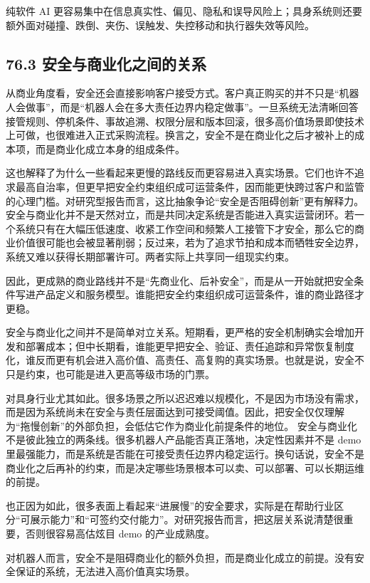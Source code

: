 纯软件 AI 更容易集中在信息真实性、偏见、隐私和误导风险上；具身系统则还要额外面对碰撞、跌倒、夹伤、误触发、失控移动和执行器失效等风险。

\subsection*{76.3 安全与商业化之间的关系}


从商业角度看，安全还会直接影响客户接受方式。客户真正购买的并不只是“机器人会做事”，而是“机器人会在多大责任边界内稳定做事”。一旦系统无法清晰回答接管规则、停机条件、事故追溯、权限分层和版本回滚，很多高价值场景即使技术上可做，也很难进入正式采购流程。换言之，安全不是在商业化之后才被补上的成本项，而是商业化成立本身的组成条件。

这也解释了为什么一些看起来更慢的路线反而更容易进入真实场景。它们也许不追求最高自治率，但更早把安全约束组织成可运营条件，因而能更快跨过客户和监管的心理门槛。对研究型报告而言，这比抽象争论“安全是否阻碍创新”更有解释力。 安全与商业化并不是天然对立，而是共同决定系统是否能进入真实运营闭环。若一个系统只有在大幅压低速度、收紧工作空间和频繁人工接管下才安全，那么它的商业价值很可能也会被显著削弱；反过来，若为了追求节拍和成本而牺牲安全边界，系统又难以获得长期部署许可。两者实际上共享同一组现实约束。

因此，更成熟的商业路线并不是“先商业化、后补安全”，而是从一开始就把安全条件写进产品定义和服务模型。谁能把安全约束组织成可运营条件，谁的商业路径才更稳。

安全与商业化之间并不是简单对立关系。短期看，更严格的安全机制确实会增加开发和部署成本；但中长期看，谁能更早把安全、验证、责任追踪和异常恢复制度化，谁反而更有机会进入高价值、高责任、高复购的真实场景。也就是说，安全不只是约束，也可能是进入更高等级市场的门票。

对具身行业尤其如此。很多场景之所以迟迟难以规模化，不是因为市场没有需求，而是因为系统尚未在安全与责任层面达到可接受阈值。因此，把安全仅仅理解为“拖慢创新”的外部负担，会低估它作为商业化前提条件的地位。 安全与商业化不是彼此独立的两条线。很多机器人产品能否真正落地，决定性因素并不是 demo 里最强能力，而是系统是否能在可接受责任边界内稳定运行。换句话说，安全不是商业化之后再补的约束，而是决定哪些场景根本可以卖、可以部署、可以长期运维的前提。

也正因为如此，很多表面上看起来“进展慢”的安全要求，实际是在帮助行业区分“可展示能力”和“可签约交付能力”。对研究报告而言，把这层关系说清楚很重要，否则很容易高估炫目 demo 的产业成熟度。

对机器人而言，安全不是阻碍商业化的额外负担，而是商业化成立的前提。没有安全保证的系统，无法进入高价值真实场景。

